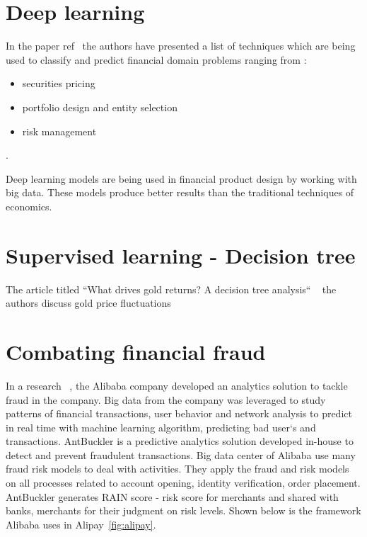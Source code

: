 \section{Deep learning}
In the paper ref~ the authors have presented a list of techniques which are being used to classify and predict financial domain problems ranging from :
\begin{itemize}
	\item securities pricing
	\item portfolio design and entity selection
	\item risk management
\end{itemize}.

Deep learning models are being used in financial product design by working with big data. These models produce better results than the traditional techniques of economics. 

\section{Supervised learning - Decision tree}
The article titled ``What drives gold returns? A decision tree analysis`` ~ the authors discuss gold price fluctuations 








\setlength{\footskip}{8mm}


\newpage
\section{Combating financial fraud}
In a research~ , the Alibaba company developed an analytics solution to tackle fraud in the company. Big data from the company was leveraged to study patterns of financial transactions, user behavior and network analysis to predict in real time with machine learning algorithm, predicting bad user`s and transactions. AntBuckler is a predictive analytics solution developed in-house to detect and prevent fraudulent transactions. Big data center of Alibaba use many fraud risk models to deal with activities. They apply the fraud and risk models on all processes related to account opening, identity verification, order placement. AntBuckler generates RAIN score - risk score for merchants and shared with banks, merchants for their judgment on risk levels.
\newline
Shown below is the framework Alibaba uses in Alipay~\ref{fig:alipay}.

